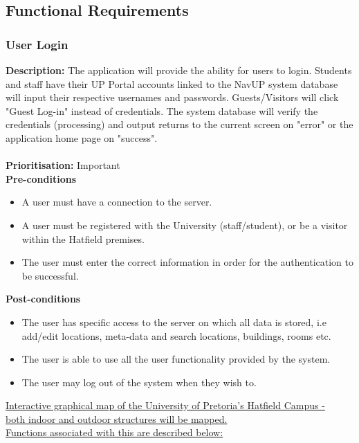\documentclass[runningheads,a4paper]{article}
\begin{document}
\subsection{Functional Requirements}

\subsubsection{User Login}
\textbf{Description:}  The application will provide the ability for users to login. Students and staff have their UP Portal accounts linked to the NavUP system database will input their respective usernames and passwords. Guests/Visitors will click "Guest Log-in" instead of credentials. The system database will verify the credentials (processing) and output returns to the current screen on "error" or the application home page on "success".\\\\
\noindent
\textbf{Prioritisation:} Important\\
  
  
\textbf{Pre-conditions}
\begin{itemize}
 	\item A user must have a connection to the server.
  	\item A user must be registered with the University (staff/student), or be a visitor within the Hatfield premises.
  	\item The user must enter the correct information in order for the authentication to be successful.
\end{itemize}
  
\textbf{Post-conditions}
\begin{itemize}
  	\item The user has specific access to the server on which all data is stored, i.e add/edit locations, meta-data and search locations, buildings, rooms etc.
  	\item The user is able to use all the user functionality provided by the system. 
  	\item The user may log out of the system when they wish to.
\end{itemize}

\noindent \underline{Interactive graphical map of the University of Pretoria's Hatfield Campus - }\\
\noindent \underline{both indoor and outdoor structures will be mapped.}\\
\noindent \underline{Functions associated with this are described below:}
\end{document}
